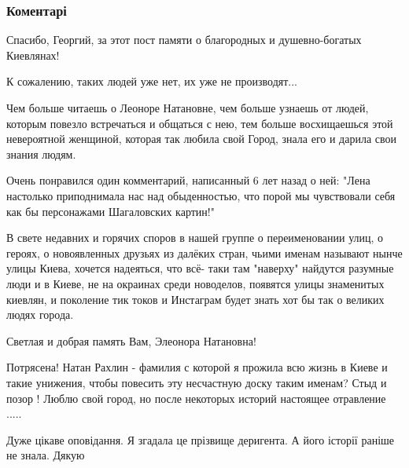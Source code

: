  
 
 
 
 
\subsubsection{Коментарі}
\label{sec:11_11_2021.fb.fb_group.story_kiev_ua.1.pamjat_slavnoj_kievljanki.cmt}

\begin{itemize} %

Спасибо, Георгий, за этот пост памяти о благородных и душевно-богатых
Киевлянах!

К сожалению, таких людей уже нет, их уже не производят...

Чем больше читаешь о Леоноре Натановне, чем больше узнаешь от людей, которым
повезло встречаться и общаться с нею, тем больше восхищаешься этой невероятной
женщиной, которая так любила свой Город, знала его и дарила свои знания людям.

Очень понравился один комментарий, написанный 6 лет назад о ней: "Лена
настолько приподнимала нас над обыденностью, что порой мы чувствовали себя как
бы персонажами Шагаловских картин!"

В свете недавних и горячих споров в нашей группе о переименовании улиц, о
героях, о новоявленных друзьях из далёких стран, чьими именам называют нынче
улицы Киева, хочется надеяться, что всё- таки там "наверху" найдутся разумные
люди и в Киеве, не на окраинах среди новоделов, появятся улицы знаменитых
киевлян, и поколение тик токов и Инстаграм будет знать хот бы так о великих
людях города.

Светлая и добрая память Вам, Элеонора Натановна!


Потрясена! Натан Рахлин - фамилия с которой я прожила всю жизнь в Киеве и
такие унижения, чтобы повесить эту несчастную доску таким именам? Стыд и позор
! Люблю свой город, но после некоторых историй настоящее отравление .....

Дуже цікаве оповідання. Я згадала це прізвище деригента. А його історії раніше не знала. Дякую


\end{itemize}
